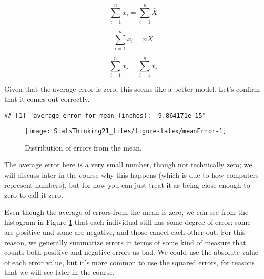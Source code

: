 \documentclass[]{book}
\newenvironment{Shaded}{\begin{snugshade}}{\end{snugshade}}
\newcommand{\KeywordTok}[1]{\textcolor[rgb]{0.13,0.29,0.53}{\textbf{#1}}}
\newcommand{\StringTok}[1]{\textcolor[rgb]{0.31,0.60,0.02}{#1}}
\newcommand{\CommentTok}[1]{\textcolor[rgb]{0.56,0.35,0.01}{\textit{#1}}}
\newcommand{\OperatorTok}[1]{\textcolor[rgb]{0.81,0.36,0.00}{\textbf{#1}}}
\newcommand{\NormalTok}[1]{#1}
\theoremstyle{definition}
\theoremstyle{definition}
\theoremstyle{definition}
\theoremstyle{remark}
\begin{document}
\[
\sum_{i=1}^{n}x_i = \sum_{i=1}^{n}\bar{X}
\]

\[
\sum_{i=1}^{n}x_i = n\bar{X}
\]

\[
\sum_{i=1}^{n}x_i = \sum_{i=1}^{n}x_i
\]

Given that the average error is zero, this seems like a better model.
Let's confirm that it comes out correctly.

\begin{Shaded}
\end{Shaded}

\begin{verbatim}
## [1] "average error for mean (inches): -9.864171e-15"
\end{verbatim}

\begin{figure}
\texttt{[image: StatsThinking21\_files/figure-latex/meanError-1]} \caption{Distribution of errors from the mean.}\label{fig:meanError}
\end{figure}

The average error here is a very small number, though not technically
zero; we will discuss later in the course why this happens (which is due
to how computers represent numbers), but for now you can just treat it
as being close enough to zero to call it zero.

Even though the average of errors from the mean is zero, we can see from
the histogram in Figure \ref{fig:meanError} that each individual still
has some degree of error; some are positive and some are negative, and
those cancel each other out. For this reason, we generally summarize
errors in terms of some kind of measure that counts both positive and
negative errors as bad. We could use the absolute value of each error
value, but it's more common to use the squared errors, for reasons that
we will see later in the course.
\end{document}
